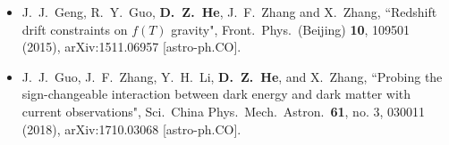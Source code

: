 \begin{itemize}[leftmargin=*]
    \item J.~J.~Geng, R.~Y.~Guo, \textbf{D.~Z.~He}, J.~F.~Zhang and X.~Zhang, ``Redshift drift constraints on $f(T)$ gravity", Front.\ Phys.\ (Beijing) {\bf 10}, 109501      (2015), arXiv:1511.06957 [astro-ph.CO].
  
    \item J.~J.~Guo, J.~F.~Zhang, Y.~H.~Li, \textbf{D.~Z.~He}, and X.~Zhang, ``Probing the sign-changeable interaction between dark energy and dark matter with current observations", Sci.\ China Phys.\ Mech.\ Astron.\ {\bf 61}, no. 3, 030011 (2018), arXiv:1710.03068 [astro-ph.CO].
    
  \end{itemize}